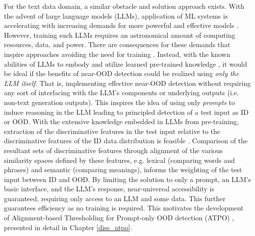 
For the text data domain, a similar obstacle and solution approach exists. With the advent of large language models (LLMs), application of ML systems is accelerating with increasing demands for more powerful and effective models \cite{angrisani2026gaps,minaee2024large}. However, training such LLMs requires an astronomical amount of computing resources, data, and power. There are consequences for these demands that inspire approaches avoiding the need for training \cite{ding2024sustainable}. Instead, with the known abilities of LLMs to embody and utilize learned pre-trained knowledge \cite{kumar2025llm}, it would be ideal if the benefits of near-OOD detection could be realized using \textit{only the LLM itself}. That is, implementing effective near-OOD detection without requiring any sort of interfacing with the LLM's components or underlying outputs (i.e. non-text generation outputs). This inspires the idea of using only \textit{prompts} to induce reasoning in the LLM leading to principled detection of a test input as ID or OOD. With the extensive knowledge embedded in LLMs from pre-training, extraction of the discriminative features in the test input relative to the discriminative features of the ID data distribution is feasible \cite{kumar2025llm,wang2024beyond}. Comparison of the resultant sets of discriminative features through alignment of the various similarity spaces defined by these features, e.g. lexical (comparing words and phrases) and semantic (comparing meanings), informs the weighting of the test input between ID and OOD. By limiting the solution to only a prompt, an LLM's basic interface, and the LLM's response, near-universal accessibility is guaranteed, requiring only access to an LLM and some data. This further guarantees efficiency as no training is required. This motivates the development of Alignment-based Thresholding for Prompt-only OOD detection (ATPO) \cite{politowicz2026achieving}, presented in detail in Chapter \ref{diss_atpo}.

